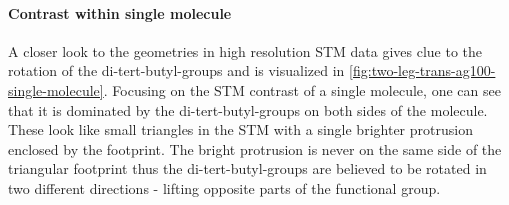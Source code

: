 \paragraph{Contrast within single molecule}
A closer look to the geometries in high resolution STM data gives clue to the rotation of the di-tert-butyl-groups and is visualized in \autoref{fig:two-leg-trans-ag100-single-molecule}. Focusing on the STM contrast of a single molecule, one can see that it is dominated by the di-tert-butyl-groups on both sides of the molecule. These look like small triangles in the STM with a single brighter protrusion enclosed by the footprint. The bright protrusion is never on the same side of the triangular footprint thus the di-tert-butyl-groups are believed to be rotated in two different directions - lifting opposite parts of the functional group.
\begin{figure}[]
	\centering
	 \quad %
\end{figure}
